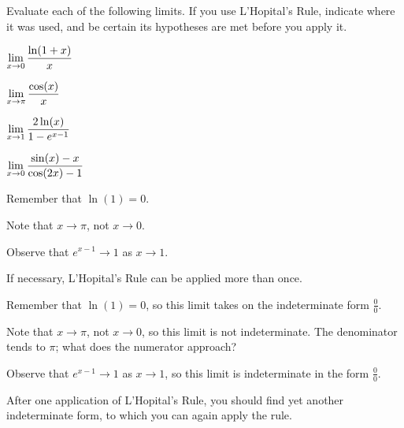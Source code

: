 \begin{activity} \label{A:2.8.1}  
Evaluate each of the following limits.  If you use L'Hopital's Rule, indicate where it was used, and be certain its hypotheses are met before you apply it.
\ba
\item $\displaystyle \lim_{x \to 0} \frac{\ln(1 + x)}{x}$
\item $\displaystyle \lim_{x \to \pi} \frac{\cos(x)}{x}$
\item $\displaystyle \lim_{x \to 1} \frac{2 \ln(x)}{1-e^{x-1}}$
\item $\displaystyle \lim_{x \to 0} \frac{\sin(x) - x}{\cos(2x)-1}$ 
\ea
\end{activity}
\begin{smallhint}
\ba
	\item Remember that $\ln(1) = 0$.
	\item Note that $x \to \pi$, not $x \to 0$.
	\item Observe that $e^{x-1} \to 1$ as $x \to 1$.
	\item If necessary, L'Hopital's Rule can be applied more than once.
\ea
\end{smallhint}
\begin{bighint}
\ba
	\item Remember that $\ln(1) = 0$, so this limit takes on the indeterminate form $\frac{0}{0}$.
	\item Note that $x \to \pi$, not $x \to 0$, so this limit is not indeterminate.  The denominator tends to $\pi$; what does the numerator approach?
	\item Observe that $e^{x-1} \to 1$ as $x \to 1$, so this limit is indeterminate in the form $\frac{0}{0}$.
	\item After one application of L'Hopital's Rule, you should find yet another indeterminate form, to which you can again apply the rule.
\ea
\end{bighint}
